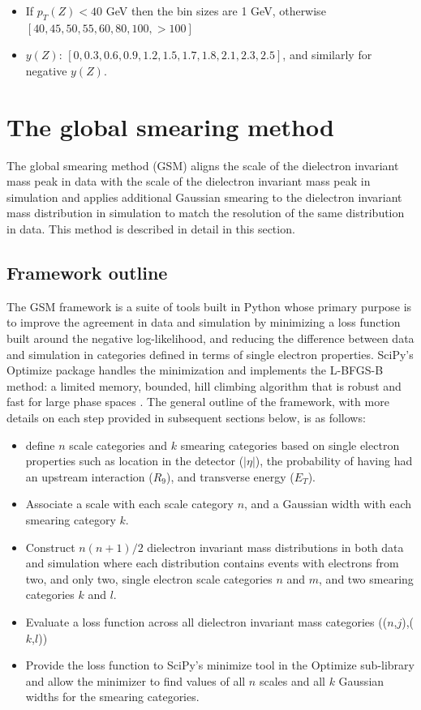 \begin{itemize}
    \item If $p_T(Z) < 40$ GeV then the bin sizes are 1 GeV, otherwise $[40, 45, 50, 55, 60, 80, 100, > 100]$
    \item $y(Z)$: $[0, 0.3, 0.6, 0.9, 1.2, 1.5, 1.7, 1.8, 2.1, 2.3, 2.5]$, and similarly for negative $y(Z)$.
\end{itemize}

\section{The global smearing method}
\label{sec:gsm}

The global smearing method (GSM) aligns the scale of the dielectron invariant mass peak in data with the scale of the dielectron invariant mass peak in simulation and applies additional Gaussian smearing to the dielectron invariant mass distribution in simulation to match the resolution of the same distribution in data. This method is described in detail in this section. 

\subsection{Framework outline}

The GSM framework is a suite of tools built in Python whose primary purpose is to improve the agreement in data and simulation by minimizing a loss function built around the negative log-likelihood, and reducing the difference between data and simulation in categories defined in terms of single electron properties. SciPy's Optimize package handles the minimization and implements the L-BFGS-B method: a limited memory, bounded, hill climbing algorithm that is robust and fast for large phase spaces \cite{byrd_lu_nocedal_zhu_1995,zhu_byrd_lu_nocedal_1997,morales_nocedal_2011}. The general outline of the framework, with more details on each step provided in subsequent sections below, is as follows:

\begin{itemize}
    \item define $n$ scale categories and $k$ smearing categories based on single electron properties such as location in the detector ($|\eta|$), the probability of having had an upstream interaction ($R_9$), and transverse energy ($E_T$).
    \item Associate a scale with each scale category $n$, and a Gaussian width with each smearing category $k$.
    \item Construct $n(n+1)/2$ dielectron invariant mass distributions in both data and simulation where each distribution contains events with electrons from two, and only two, single electron scale categories $n$ and $m$, and two smearing categories $k$ and $l$.
    \item Evaluate a loss function across all dielectron invariant mass categories (($n$,$j$),($k$,$l$)) 
    \item Provide the loss function to SciPy's minimize tool in the Optimize sub-library and allow the minimizer to find values of all $n$ scales and all $k$ Gaussian widths for the smearing categories.
\end{itemize}

